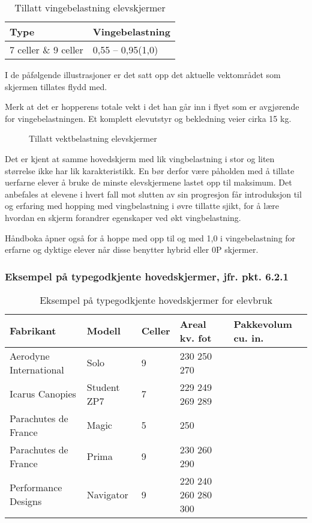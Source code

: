 \begin{table}
	\caption{Tillatt vingebelastning elevskjermer}
	\begin{center}
	\begin{tabular}{ | l | l | }
		\hline
		Type & Vingebelastning \\
		\hline
		7 celler \& 9 celler &  0,55 – 0,95(1,0)\footnotemark \\
		\hline
	\end{tabular}
\end{center}
\end{table}

I de påfølgende illustrasjoner er det satt opp det aktuelle vektområdet som skjermen tillates flydd med.

Merk at det er hopperens totale vekt i det han går inn i flyet som er avgjørende for vingebelastningen. Et komplett elevutstyr og bekledning veier cirka 15 kg.

\begin{figure}
	\caption{Tillatt vektbelastning elevskjermer}
\end{figure}

Det er kjent at samme hovedskjerm med lik vingbelastning i stor og liten størrelse ikke har lik karakteristikk. En bør derfor være påholden med å tillate uerfarne elever å bruke de minste elevskjermene lastet opp til maksimum. Det anbefales at elevene i hvert fall mot slutten av sin progresjon får introduksjon til og erfaring med hopping med vingbelastning i øvre tillatte sjikt, for å lære hvordan en skjerm forandrer egenskaper ved økt vingbelastning.

Håndboka åpner også for å hoppe med opp til og med 1,0 i vingebelastning for erfarne og dyktige elever når disse benytter hybrid eller 0P skjermer.

\subsubsection{Eksempel på typegodkjente hovedskjermer, jfr. pkt. 6.2.1}
\begin{table}
	\caption{Eksempel på typegodkjente hovedskjermer for elevbruk}
	\begin{tabular}{ | p{4cm} | p{2cm} | p{2cm} | p{2cm} | p{2cm} | }
		\hline
		Fabrikant & Modell & Celler & Areal kv. fot & Pakkevolum cu. in. \\
		\hline
		Aerodyne International & Solo & 9 & 230 250 270 & \\
		\hline
		Icarus Canopies & Student ZP7 & 7 & 229 249 269 289 & \\
		\hline
		Parachutes de France & Magic & 5 & 250 & \\
		\hline
		Parachutes de France & Prima & 9 & 230 260 290 & \\
		\hline
		Performance Designs & Navigator & 9 & 220 240 260 280 300 & \\
		\hline
	\end{tabular}
\end{table}

